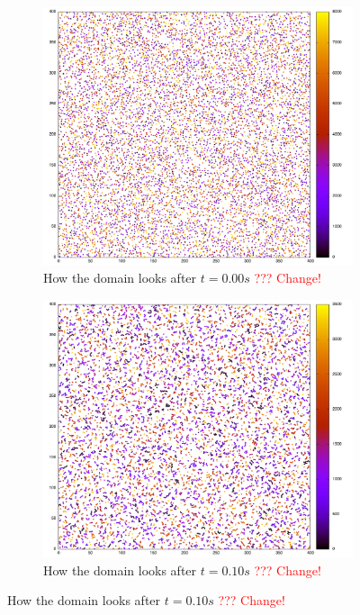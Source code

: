\begin{figure}[h]
	\begin{center}
		\begin{subfigure}[t]{0.45\textwidth}
			\includegraphics[width = \textwidth]{fig/000_off.png}
			\caption{How the domain looks after $ t = 0.00 s $ \textcolor{red}{??? Change!}}
			\label{fig:0}
		\end{subfigure}
		\begin{subfigure}[t]{0.45\textwidth}
			\includegraphics[width = \textwidth]{fig/0010_off.png}
			\caption{How the domain looks after $ t = 0.10s $ \textcolor{red}{??? Change!} }

\end{subfigure}
\end{center}
\end{figure}
